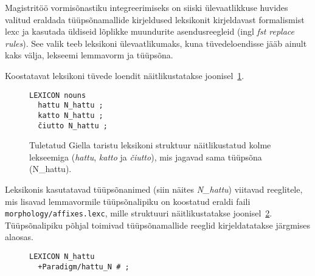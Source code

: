 \documentclass[12pt,a4paper]{article}
\begin{document}
Magistritöö vormisõnastiku integreerimiseks on siiski ülevaatlikkuse huvides valitud eraldada tüüpsõna\-mallide kirjeldused leksikonit kirjeldavast formalismist lexc ja kasutada üldiseid lõplikke muundurite asendus\-reegleid (ingl \textit{fst replace rules}). See valik teeb leksikoni ülevaatlikumaks, kuna tüvede\-loendisse jääb ainult kaks välja, lekseemi lemma\-vorm ja tüüpsõna.

Koostatavat leksikoni tüvede loendit näitlikustatakse joonisel~\ref{code:giella-lexicon}. 

\begin{figure}[H]
  \center
\begin{verbatim}
LEXICON nouns
  hattu N_hattu ;
  katto N_hattu ;
  čiutto N_hattu ;
\end{verbatim}
\caption{Tuletatud Giella taristu leksikoni struktuur näitlikustatud kolme lekseemiga (\textit{hattu}, \textit{katto} ja \textit{čiutto}), mis jagavad sama tüüp\-sõna (N\_hattu).
  \label{code:giella-lexicon}}
\end{figure}

Leksikonis kasutatavad tüüpsõnanimed (siin näites \textit{N\_hattu}) viitavad reeglitele, mis lisavad lemma\-vormile tüüpsõna\-lipiku on koostatud eraldi faili \texttt{morphology/affixes.lexc}, mille struktuuri näitlikustatakse joonisel~\ref{code:giella-affixes}. Tüüpsõna\-lipiku põhjal toimivad tüüpsõna\-mallide reeglid kirjeldatatakse järgmises alaosas.

\begin{figure}[H]
  \center
\begin{verbatim}
LEXICON N_hattu
  +Paradigm/hattu_N # ;
\end{verbatim}
\caption{
  \label{code:giella-affixes}}
\end{figure}



% 
% 
% 
%
\end{document}

